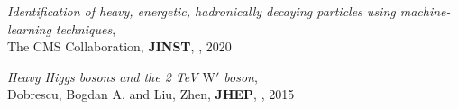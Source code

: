 \documentclass[12pt]{article}
\begin{document}
\begin{flushleft}
\begin{thebibliography}{1}
  \textit{Identification of heavy, energetic, hadronically decaying particles using machine-learning techniques},\\
 The CMS Collaboration, \textbf{JINST}, , 2020


   \textit{Heavy Higgs bosons and the 2 TeV $\mathrm{W'}$ boson},\\
  Dobrescu, Bogdan A. and Liu, Zhen, \textbf{JHEP}, , 2015

\end{thebibliography}
\end{flushleft}


%
%
\end{document}

